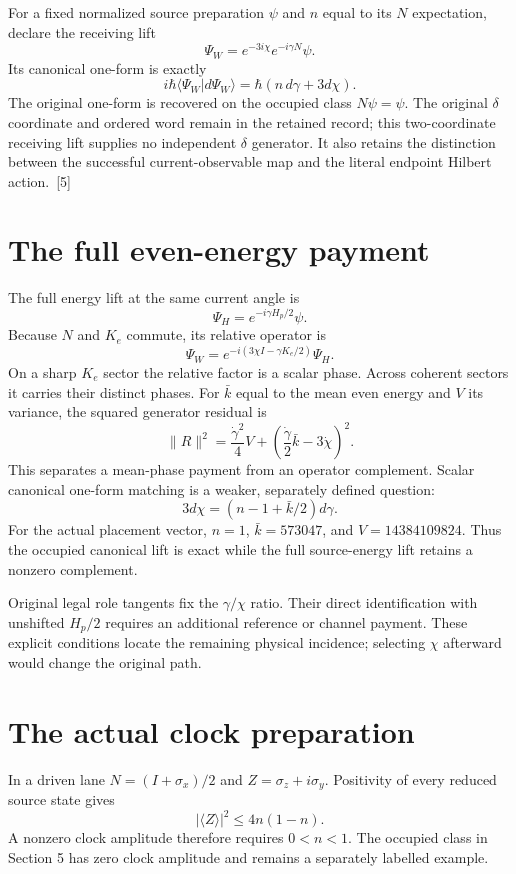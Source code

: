 \documentclass[10pt,twocolumn,letterpaper]{article}
\begin{document}
For a fixed normalized source preparation $\psi$ and $n$ equal to its $N$ expectation, declare the receiving lift
\[
\Psi_W=e^{-3i\chi}e^{-i\gamma N}\psi.
\]
Its canonical one-form is exactly
\[
i\hbar\langle\Psi_W|d\Psi_W\rangle=\hbar(n\,d\gamma+3d\chi).
\]
The original one-form is recovered on the occupied class $N\psi=\psi$. The original $\delta$ coordinate and ordered word remain in the retained record; this two-coordinate receiving lift supplies no independent $\delta$ generator. It also retains the distinction between the successful current-observable map and the literal endpoint Hilbert action.~[5]

\section{The full even-energy payment}
The full energy lift at the same current angle is
\[
\Psi_H=e^{-i\gamma H_p/2}\psi.
\]
Because $N$ and $K_e$ commute, its relative operator is
\[
\Psi_W=e^{-i(3\chi I-\gamma K_e/2)}\Psi_H.
\]
On a sharp $K_e$ sector the relative factor is a scalar phase. Across coherent sectors it carries their distinct phases. For $\bar{k}$ equal to the mean even energy and $V$ its variance, the squared generator residual is
\[
\|R\|^2=\frac{\dot\gamma^2}{4}V+\left(\frac{\dot\gamma}{2}\bar{k}-3\dot\chi\right)^2.
\]
This separates a mean-phase payment from an operator complement. Scalar canonical one-form matching is a weaker, separately defined question:
\[
3d\chi=(n-1+\bar{k}/2)d\gamma.
\]
For the actual placement vector, $n=1$, $\bar{k}=573047$, and $V=14384109824$. Thus the occupied canonical lift is exact while the full source-energy lift retains a nonzero complement.

Original legal role tangents fix the $\gamma/\chi$ ratio. Their direct identification with unshifted $H_p/2$ requires an additional reference or channel payment. These explicit conditions locate the remaining physical incidence; selecting $\chi$ afterward would change the original path.

\section{The actual clock preparation}
In a driven lane $N=(I+\sigma_x)/2$ and $Z=\sigma_z+i\sigma_y$. Positivity of every reduced source state gives
\[
|\langle Z\rangle|^2\leq 4n(1-n).
\]
A nonzero clock amplitude therefore requires $0<n<1$. The occupied class in Section 5 has zero clock amplitude and remains a separately labelled example.
\end{document}
